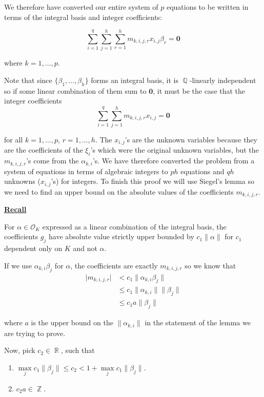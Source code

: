 \documentclass[a4paper, 11pt]{book}
\newcommand{\recall}{\underline{\textbf{Recall}} }
\DeclareMathOperator{\Q}{\mathbb{Q}}
\DeclareMathOperator{\R}{\mathbb{R}}
\DeclareMathOperator{\Z}{\mathbb{Z}}
\begin{document}
{We therefore have converted our entire system of $p$ equations to be written in terms of the integral basis and integer coefficients: 

\[\sum\limits_{i=1}^{q}\sum\limits_{j=1}^{h}\sum\limits_{r=1}^{h} m_{k,i,j,r}x_{i,j}\beta_{r} = \mathbf{0}\]

where $k = 1, \ldots, p$.\par

Note that since $\{\beta_1, \ldots, \beta_h\}$ forms an integral basis, it is $\Q$-linearly independent so if some linear combination of them sum to $\mathbf{0}$, it must be the case that the integer coefficients 
\[\sum\limits_{i=1}^{q}\sum\limits_{j=1}^{h} m_{k,i,j,r}x_{i,j} = \mathbf{0}\] 

for all $k = 1, \ldots, p$, $r = 1, \ldots, h$. The $x_{i,j}$'s are the unknown variables because they are the coefficients of the $\xi_i$'s which were the original unknown variables, but the $m_{k,i,j,r}$'s come from the $\alpha_{k,i}$'s. We have therefore converted the problem from a system of equations in terms of algebraic integers to $ph$ equations and $qh$ unknowns ($x_{i,j}$'s) for integers. To finish this proof we will use Siegel's lemma so we need to find an upper bound on the absolute values of the coefficients $m_{k,i,j,r}$.\par

\recall{For $\alpha \in \mathcal{O}_K$ expressed as a linear combination of the integral basis, the coefficients $g_j$ have absolute value strictly upper bounded by $c_1 \| \alpha \|$ for $c_1$ dependent only on $K$ and not $\alpha$.\par}

If we use $\alpha_{k,i}\beta_{j}$ for $\alpha$, the coefficients are exactly $m_{k,i,j,r}$ so we know that 
\begin{align*}
    \vert m_{k,i,j,r} \vert &< c_1 \| \alpha_{k,i}\beta_{j} \|  \\
                            &\leq c_1 \| \alpha_{k, i} \| \| \beta_{j} \| \\ 
                            &\leq c_{1}a \| \beta_{j} \|
\end{align*}

where $a$ is the upper bound on the $\| \alpha_{k,i} \|$ in the statement of the lemma we are trying to prove.\par

Now, pick $c_2 \in \R$, such that
\begin{enumerate}
    \item{$\max\limits_{j} c_{1} \| \beta_{j} \| \leq c_2 < 1 + \max\limits_{j} c_{1} \| \beta_{j} \|$.}
    \item{$c_{2}a \in \Z$.}
\end{enumerate}

}
\end{document}
